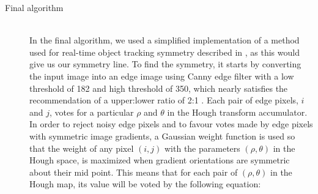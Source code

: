 \begin{description}
	\item[Final algorithm] \hfill \\
	In the final algorithm, we used a simplified implementation of a method used for real-time object tracking symmetry described in \cite{li2006real}, as this would give us our symmetry line. To find the symmetry, it starts by converting the input image into an edge image using Canny edge filter with a low threshold of 182 and high threshold of 350, which nearly satisfies the recommendation of a upper:lower ratio of 2:1 \cite{OCV}. Each pair of edge pixels, $i$ and $j$, votes for a particular $\rho$ and $\theta$ in the Hough transform accumulator. In order to reject noisy edge pixels and to favour votes made by edge pixels with symmetric image gradients, a Gaussian weight function is used so that the weight of any pixel $(i,j)$ with the parameters $(\rho,\theta)$ in the Hough space, is maximized when gradient orientations are symmetric about their mid point. This means that for each pair of $(\rho,\theta)$  in the Hough map, its value will be voted by the following equation:


\end{description}
